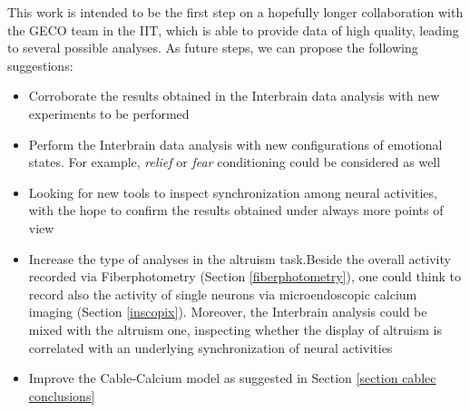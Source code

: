 \documentclass[12pt, a4paper]{report}
\begin{document}
This work is intended to be the first step on a hopefully longer collaboration with the GECO team in the IIT, which is able to provide data of high quality, leading to several possible analyses. As future steps, we can propose the following suggestions:

\begin{itemize}
	\item Corroborate the results obtained in the Interbrain data analysis with new experiments to be performed
	
	\item Perform the Interbrain data analysis with new configurations of emotional states. For example, \textit{relief} or \textit{fear} conditioning could be considered as well
	
	
	\item Looking for new tools to inspect synchronization among neural activities, with the hope to confirm the results obtained under always more points of view
	
	\item Increase the type of analyses in the altruism task.Beside the overall activity recorded via Fiberphotometry (Section \ref{fiberphotometry}), one could think to record also the activity of single neurons via microendoscopic calcium imaging (Section \ref{inscopix}). Moreover, the Interbrain analysis could be mixed with the altruism one, inspecting whether the display of altruism is correlated with an underlying synchronization of neural activities
	
	\item Improve the Cable-Calcium model as suggested in Section \ref{section cablec conclusions}
\end{itemize}
\end{document}
